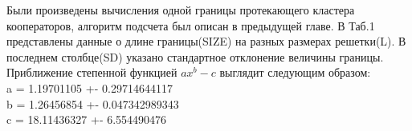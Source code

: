 \documentclass[14pt]{article}
\begin{document}
\par Были произведены вычисления одной границы протекающего кластера кооператоров, алгоритм подсчета был описан в предыдущей главе. В Таб.1 представлены данные о длине границы(SIZE) на разных размерах решетки(L). В последнем столбце(SD) указано стандартное отклонение величины границы. Приближение степенной функцией $ax^{b} - c$ выглядит следующим образом:\\
a = 1.19701105 +- 0.29714644117\\
b = 1.26456854 +-  0.047342989343\\
c = 18.11436327 +- 6.554490476\\
\begin{figure}[H]
	\begin{floatrow}
	
	\end{floatrow}
\end{figure}
\end{document}
